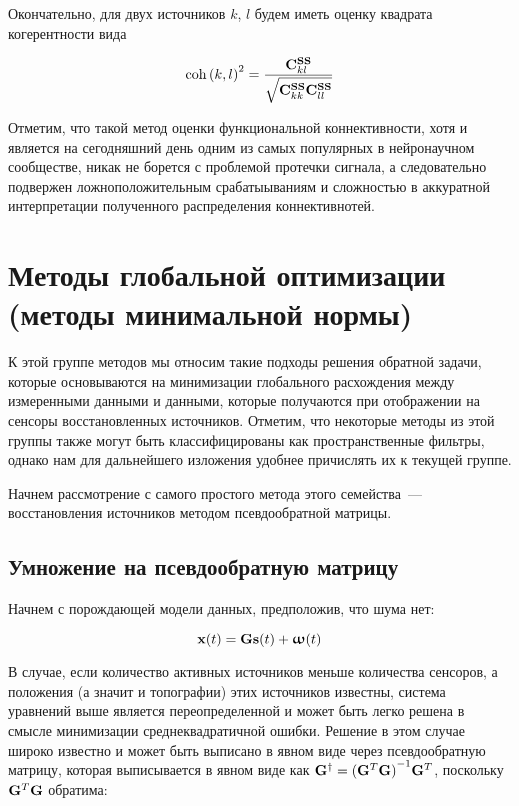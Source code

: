 Окончательно, для двух источников $k$, $l$ будем иметь оценку квадрата когерентности вида

\begin{equation}
    \operatorname{coh}{(k, l)}^2 = \frac{\mathbf{C}^{\mathbf{S S}}_{kl}}{\sqrt{\mathbf{C}^{\mathbf{S S}}_{kk} \mathbf{C}^{\mathbf{S S}}_{ll}}}
\end{equation}

Отметим, что такой метод оценки функциональной коннективности, хотя и является на сегодняшний
день одним из самых популярных в нейронаучном сообществе, никак не борется с проблемой
протечки сигнала, а следовательно подвержен ложноположительным срабатыываниям и сложностью
в аккуратной интерпретации полученного распределения коннективнотей.

\section{Методы глобальной оптимизации (методы минимальной нормы)}

К этой группе методов мы относим такие подходы решения обратной задачи,
которые основываются на минимизации глобального расхождения между измеренными данными
и данными, которые получаются при отображении на сенсоры восстановленных источников.
Отметим, что некоторые методы из этой группы также могут быть классифицированы как
пространственные фильтры, однако нам для дальнейшего изложения удобнее причислять их к
текущей группе.

Начнем рассмотрение с самого простого метода этого семейства~--- восстановления источников методом
псевдообратной матрицы.

\subsection{Умножение на псевдообратную матрицу}

Начнем с порождающей модели данных, предположив, что шума нет: 

\begin{equation}
    \mathbf{x}(t) = \mathbf{G} \mathbf{s}(t) + \boldsymbol{\upomega}(t)
    \label{gm_pinv}
\end{equation}

В случае, если количество активных источников меньше количества сенсоров,
а положения (а значит и топографии) этих источников известны, система
уравнений выше является переопределенной и может быть легко решена в смысле
минимизации среднеквадратичной ошибки.
Решение в этом случае широко известно и может быть выписано в явном виде
через псевдообратную матрицу, которая выписывается в явном виде как
$\mathbf{G}^\dagger = {(\mathbf{G}^T\mathbf{G})}^{-1}\mathbf{G}^T$, поскольку $\mathbf{G}^T\mathbf{G}$ обратима:

